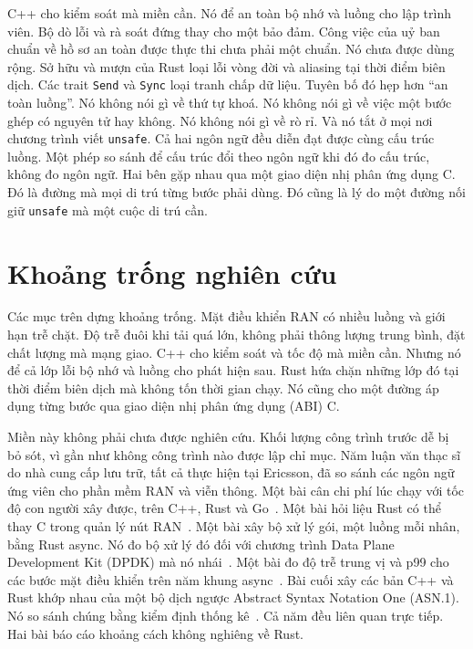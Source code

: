 C++ cho kiểm soát mà miền cần. Nó để an toàn bộ nhớ và luồng cho lập trình viên. Bộ dò lỗi và
rà soát đứng thay cho một bảo đảm. Công việc của uỷ ban chuẩn về hồ sơ an toàn được thực thi
chưa phải một chuẩn. Nó chưa được dùng rộng. Sở hữu và mượn của Rust loại lỗi vòng đời và
aliasing tại thời điểm biên dịch. Các trait \texttt{Send} và \texttt{Sync} loại tranh chấp dữ
liệu. Tuyên bố đó hẹp hơn ``an toàn luồng''. Nó không nói gì về thứ tự khoá. Nó không nói gì về
việc một bước ghép có nguyên tử hay không. Nó không nói gì về rò rỉ. Và nó tắt ở mọi nơi chương
trình viết \texttt{unsafe}. Cả hai ngôn ngữ đều diễn đạt được cùng cấu trúc luồng. Một phép so
sánh để cấu trúc đổi theo ngôn ngữ khi đó đo cấu trúc, không đo ngôn ngữ. Hai bên gặp nhau qua
một giao diện nhị phân ứng dụng C. Đó là đường mà mọi di trú từng bước phải dùng. Đó cũng là
lý do một đường nối giữ \texttt{unsafe} mà một cuộc di trú cần.

\section{Khoảng trống nghiên cứu}\label{sec:gap}
Các mục trên dựng khoảng trống. Mặt điều khiển RAN có nhiều luồng và giới hạn trễ chặt. Độ trễ
đuôi khi tải quá lớn, không phải thông lượng trung bình, đặt chất lượng mà mạng giao. C++ cho
kiểm soát và tốc độ mà miền cần. Nhưng nó để cả lớp lỗi bộ nhớ và luồng cho phát hiện sau. Rust
hứa chặn những lớp đó tại thời điểm biên dịch mà không tốn thời gian chạy. Nó cũng cho một
đường áp dụng từng bước qua giao diện nhị phân ứng dụng (ABI) C.

Miền này không phải chưa được nghiên cứu. Khối lượng công trình trước dễ bị bỏ sót, vì gần như
không công trình nào được lập chỉ mục. Năm luận văn thạc sĩ do nhà cung cấp lưu trữ, tất cả
thực hiện tại Ericsson, đã so sánh các ngôn ngữ ứng viên cho phần mềm RAN và viễn thông. Một
bài cân chi phí lúc chạy với tốc độ con người xây được, trên C++, Rust và
Go~\cite{karlback2021ran}. Một bài hỏi liệu Rust có thể thay C trong quản lý nút
RAN~\cite{olsson2023ranmgmt}. Một bài xây bộ xử lý gói, một luồng mỗi nhân, bằng Rust async. Nó
đo bộ xử lý đó đối với chương trình Data Plane Development Kit (DPDK) mà nó
nhái~\cite{olsson2023asyncpackets}. Một bài đo độ trễ trung vị và p99 cho các bước mặt điều
khiển trên năm khung async~\cite{arvidsson2025async}. Bài cuối xây các bản C++ và Rust khớp
nhau của một bộ dịch ngược Abstract Syntax Notation One (ASN.1). Nó so sánh chúng bằng kiểm
định thống kê~\cite{emberg2023asn1}. Cả năm đều liên quan trực tiếp. Hai bài báo cáo khoảng
cách không nghiêng về Rust.

